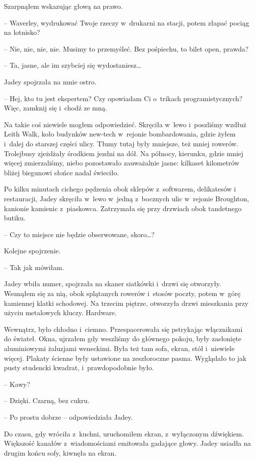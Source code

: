 \documentclass[oneside,polish,12pt,sfheadings]{mwbk}
\begin{document}
Szarpnąłem wskazując głową na prawo. 

-- Waverley, wydrukować Twoje
rzeczy w~drukarni na stacji, potem złapać pociąg na lotnisko?

-- Nie, nie, nie, nie. Musimy to przemyśleć. Bez pośpiechu, to bilet
open, prawda?

-- Ta, jasne, ale im szybciej się wydostaniesz\ldots

Jadey spojrzała na mnie ostro. 

-- Hej, kto tu jest ekspertem? Czy
opowiadam Ci o~trikach programistycznych? Więc, zamknij się i~chodź ze
mną.

Na takie coś niewiele mogłem odpowiedzieć. Skręciła w~lewo i~poszliśmy
wzdłuż Leith Walk, koło budynków new-tech w~rejonie bombardowania, gdzie
żyłem i~dalej do starszej części ulicy. Tłumy tutaj były mniejsze, też
mniej rowerów. Trolejbusy zjeżdżały środkiem jezdni na dół. Na północy,
kierunku, gdzie mniej więcej zmierzaliśmy, niebo pozostawało zauważalnie
jasne: kilkaset kilometrów bliżej biegunowi słońce nadal świeciło.

Po kilku minutach cichego pędzenia obok sklepów z~softwarem, delikatesów
i restauracji, Jadey skręciła w~lewo w~jedną z~bocznych ulic w~rejonie
Broughton, kanionie kamienic z~piaskowca. Zatrzymała się przy drzwiach
obok tandetnego butiku.

-- Czy to miejsce nie będzie obserwowane, skoro\ldots?

Kolejne spojrzenie. 

-- Tak jak mówiłam.

Jadey wbiła numer, spojrzała na skaner siatkówki i~drzwi się otworzyły.
Wsunąłem się za nią, obok splątanych rowerów i~stosów poczty, potem w~górę kamiennej klatki schodowej. Na trzecim piętrze, otworzyła drzwi
mieszkania przy użyciu metalowych kluczy. Hardware.

Wewnątrz, było chłodno i~ciemno. Przespacerowała się pstrykając
włącznikami do świateł. Okna, ujrzałem gdy weszliśmy do głównego pokoju,
były zasłonięte aluminiowymi żaluzjami weneckimi. Była też tam sofa,
ekran, stół i~niewiele więcej. Plakaty ścienne były ustawione na
zeszłoroczne pasma. Wyglądało to jak pusty studencki kwadrat, i~prawdopodobnie było.

-- Kawy?

-- Dzięki. Czarną, bez cukru.

-- Po prostu dobrze -- odpowiedziała Jadey.

Do czasu, gdy wróciła z~kuchni, uruchomiłem ekran, z~wyłączonym
dźwiękiem. Większość kanałów z~wiadomościami emitowała gadające głowy.
Jadey usiadła na drugim końcu sofy, kiwnęła na ekran.
\end{document}
